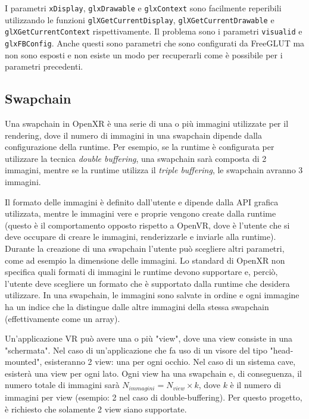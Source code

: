 \documentclass[twoside]{supsistudent}
\begin{document}
I parametri \texttt{xDisplay}, \texttt{glxDrawable} e \texttt{glxContext} sono facilmente reperibili utilizzando le funzioni \texttt{glXGetCurrentDisplay}, \texttt{glXGetCurrentDrawable} e \texttt{glXGetCurrentContext} rispettivamente. Il problema sono i parametri \texttt{visualid} e \texttt{glxFBConfig}. Anche questi sono parametri che sono configurati da FreeGLUT ma non sono esposti e non esiste un modo per recuperarli come è possibile per i parametri precedenti.

\subsection{Swapchain}

Una swapchain in OpenXR è una serie di una o più immagini utilizzate per il rendering, dove il numero di immagini in una swapchain dipende dalla configurazione della runtime. Per esempio, se la runtime è configurata per utilizzare la tecnica \textit{double buffering}, una swapchain sarà composta di 2 immagini, mentre se la runtime utilizza il \textit{triple buffering}, le swapchain avranno 3 immagini.

Il formato delle immagini è definito dall'utente e dipende dalla API grafica utilizzata, mentre le immagini vere e proprie vengono create dalla runtime (questo è il comportamento opposto rispetto a OpenVR, dove è l'utente che si deve occupare di creare le immagini, renderizzarle e inviarle alla runtime). Durante la creazione di una swapchain l'utente può scegliere altri parametri, come ad esempio la dimensione delle immagini. Lo standard di OpenXR non specifica quali formati di immagini le runtime devono supportare e, perciò, l'utente deve scegliere un formato che è supportato dalla runtime che desidera utilizzare. In una swapchain, le immagini sono salvate in ordine e ogni immagine ha un indice che la distingue dalle altre immagini della stessa swapchain (effettivamente come un array).

Un'applicazione VR può avere una o più "view", dove una view consiste in una "schermata". Nel caso di un'applicazione che fa uso di un visore del tipo "head-mounted", esisteranno 2 view: una per ogni occhio. Nel caso di un sistema cave, esisterà una view per ogni lato. Ogni view ha una swapchain e, di conseguenza, il numero totale di immagini sarà $ {N}_{immagini} = {N}_{view} \times k $, dove $ k $ è il numero di immagini per view (esempio: 2 nel caso di double-buffering). Per questo progetto, è richiesto che solamente 2 view siano supportate.
\end{document}
